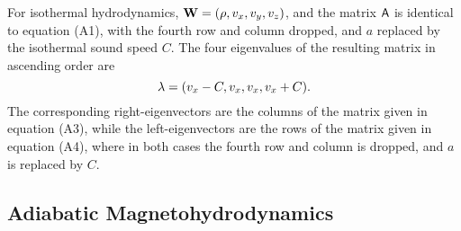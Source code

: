For isothermal hydrodynamics, ${\bf W} = (\rho, v_{x}, v_{y}, v_{z})$, and the
matrix ${\sf A}$ is identical to equation (A1), with the fourth row and column
dropped, and $a$ replaced by the isothermal sound speed $C$.
The four eigenvalues of the resulting matrix in ascending order are
\begin{equation}
{\bf \lambda} = (v_{x}-C, v_{x}, v_{x}, v_{x}+C).
\end{equation}
The corresponding right-eigenvectors are the columns of the matrix given
in equation (A3), while the left-eigenvectors are the rows of the matrix given
in equation (A4), where in both cases the fourth row and column is dropped,
and $a$ is replaced by $C$.

\subsection{Adiabatic Magnetohydrodynamics}

